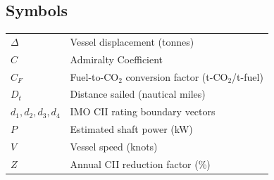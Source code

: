 \documentclass[12pt, a4paper]{report}
\begin{document}
\vspace{1cm}

\subsection*{Symbols}
\begin{tabular}{ll}
$\Delta$ & Vessel displacement (tonnes) \\
$C$ & Admiralty Coefficient \\
$C_F$ & Fuel-to-CO$_2$ conversion factor (t-CO$_2$/t-fuel) \\
$D_t$ & Distance sailed (nautical miles) \\
$d_1, d_2, d_3, d_4$ & IMO CII rating boundary vectors \\
$P$ & Estimated shaft power (kW) \\
$V$ & Vessel speed (knots) \\
$Z$ & Annual CII reduction factor (\%) \\
\end{tabular}

\newpage

\clearpage
{}










\appendix

\end{document}
